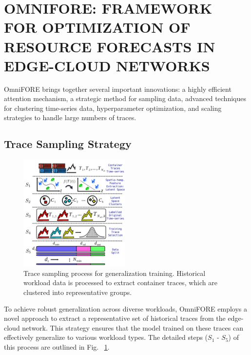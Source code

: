 \section{OMNIFORE: FRAMEWORK FOR OPTIMIZATION OF RESOURCE FORECASTS IN EDGE-CLOUD NETWORKS}
\label{sec: Proposed Solution}

OmniFORE brings together several important innovations: a highly efficient attention mechanism, a strategic method for sampling data, advanced techniques for clustering time-series data, hyperparameter optimization, and scaling strategies to handle large numbers of traces.

\subsection{Trace Sampling Strategy}
\label{sec: Trace Sampling Strategy}


\begin{figure}
\centering
\includegraphics[width=0.49\textwidth]{img/proposed_solution_trace_selection.pdf}
\caption{Trace sampling process for generalization training. Historical workload data is processed to extract container traces, which are clustered into representative groups.}
\label{fig:proposed_solution_trace_selection}
\end{figure}

To achieve robust generalization across diverse workloads, OmniFORE employs a novel approach to extract a representative set of historical traces from the edge-cloud network. This strategy ensures that the model trained on these traces can effectively generalize to various workload types. The detailed steps ($S_1$ - $S_5$) of this process are outlined in Fig. ~\ref{fig:proposed_solution_trace_selection}.

